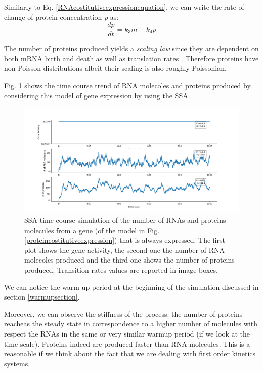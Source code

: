 \documentclass[12pt,a4paper]{report}
\begin{document}
Similarly to Eq. \ref{RNAcostitutiveexpressionequation}, we can write the rate of change of protein concentration \emph{p} as:
\begin{equation}\label{proteincostitutiveexpressionequation}
 \frac{dp}{dt} = k_{3}m - k_{4}p 
\end{equation}

The number of proteins produced yields a \emph{scaling law} since they are dependent on both mRNA birth and death as well as translation rates \cite{Article}. Therefore proteins have non-Poisson distributions albeit their scaling is also roughly Poissonian.

Fig. \ref{firstmodelka1ki0timeplot} shows the time course trend of RNA molecoles and proteins produced by considering this model of gene expression by using the SSA. 

\newpage

\begin{figure}[!ht]
\hspace*{-2.5cm} 
\includegraphics[scale=0.59]{firstmodelka1ki0timeplot.png}
\caption{SSA time course simulation of the number of RNAs and proteins molecules from a gene (of the model in Fig.\ref{proteincostitutiveexpression}) that is always expressed. The first plot shows the gene activity, the second one the number of RNA molecoles produced and the third one shows the number of proteins produced. Transition rates values are reported in image boxes.}
\label{firstmodelka1ki0timeplot}
\end{figure}

We can notice the warm-up period at the beginning of the simulation discussed in section \ref{warmupsection}. 

Moreover, we can observe the stiffness of the process: the number of proteins reacheas the steady state in correspondence to a higher number of molecules with respect the RNAs in the same or very similar warmup period (if we look at the time scale). Proteins indeed are produced faster than RNA molecules. This is a reasonable if we think about the fact that we are dealing with first order kinetics systems. 
\end{document}
